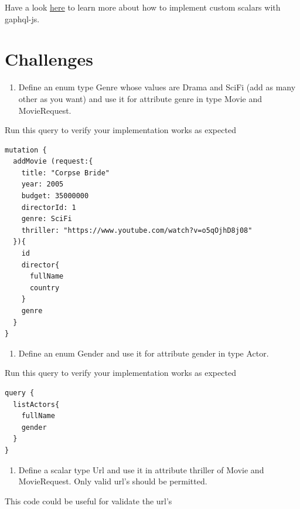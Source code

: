 \documentclass[]{book}
\providecommand{\tightlist}{%
  \setlength{\itemsep}{0pt}\setlength{\parskip}{0pt}}
\begin{document}
Have a look
\href{https://graphql.org/graphql-js/type/\#graphqlscalartype}{here} to
learn more about how to implement custom scalars with gaphql-js.

\section{Challenges}\label{challenges-1}

\begin{enumerate}
\def\labelenumi{\arabic{enumi}.}
\tightlist
\item
  Define an enum type Genre whose values are Drama and SciFi (add as
  many other as you want) and use it for attribute genre in type Movie
  and MovieRequest.
\end{enumerate}

Run this query to verify your implementation works as expected

\begin{verbatim}
mutation {
  addMovie (request:{
    title: "Corpse Bride"
    year: 2005
    budget: 35000000
    directorId: 1
    genre: SciFi
    thriller: "https://www.youtube.com/watch?v=o5qOjhD8j08"
  }){
    id
    director{
      fullName
      country
    }
    genre
  }
}
\end{verbatim}

\begin{enumerate}
\def\labelenumi{\arabic{enumi}.}
\setcounter{enumi}{1}
\tightlist
\item
  Define an enum Gender and use it for attribute gender in type Actor.
\end{enumerate}

Run this query to verify your implementation works as expected

\begin{verbatim}
query {
  listActors{
    fullName
    gender
  }
}
\end{verbatim}

\begin{enumerate}
\def\labelenumi{\arabic{enumi}.}
\setcounter{enumi}{2}
\tightlist
\item
  Define a scalar type Url and use it in attribute thriller of Movie and
  MovieRequest. Only valid url's should be permitted.
\end{enumerate}

This code could be useful for validate the url's
\end{document}
